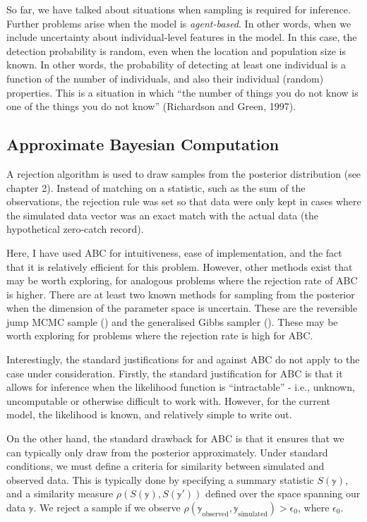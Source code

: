\documentclass[
  oneside]{book}
\begin{document}
So far, we have talked about situations when sampling is required for inference. Further problems arise when the model is \emph{agent-based}. In other words, when we include uncertainty about individual-level features in the model. In this case, the detection probability is random, even when the location and population size is known. In other words, the probability of detecting at least one individual is a function of the number of individuals, and also their individual (random) properties. This is a situation in which ``the number of things you do not know is one of the things you do not know'' (Richardson and Green, 1997).

\hypertarget{approximate-bayesian-computation}{%
\subsection{Approximate Bayesian Computation}\label{approximate-bayesian-computation}}

A rejection algorithm is used to draw samples from the posterior distribution (see chapter 2). Instead of matching on a statistic, such as the sum of the observations, the rejection rule was set so that data were only kept in cases where the simulated data vector was an exact match with the actual data (the hypothetical zero-catch record).

Here, I have used ABC for intuitiveness, ease of implementation, and the fact that it is relatively efficient for this problem. However, other methods exist that may be worth exploring, for analogous problems where the rejection rate of ABC is higher. There are at least two known methods for sampling from the posterior when the dimension of the parameter space is uncertain. These are the reversible jump MCMC sample (\citet{green1995}) and the generalised Gibbs sampler (\citet{keith2015}). These may be worth exploring for problems where the rejection rate is high for ABC.

Interestingly, the standard justifications for and against ABC do not apply to the case under consideration. Firstly, the standard justification for ABC is that it allows for inference when the likelihood function is ``intractable'' - i.e., unknown, uncomputable or otherwise difficult to work with. However, for the current model, the likelihood is known, and relatively simple to write out.

On the other hand, the standard drawback for ABC is that it ensures that we can typically only draw from the posterior approximately. Under standard conditions, we must define a criteria for similarity between simulated and observed data. This is typically done by specifying a summary statistic \(S(\mathbb y)\), and a similarity measure \(\rho(S(\mathbb y), S(\mathbb y'))\) defined over the space spanning our data \(\mathbb y\). We reject a sample if we observe \(\rho(\mathbb y_{\text{observed}}, \mathbb y_{\text{simulated}} ) > \epsilon_0\), where \(\epsilon_0\).
\end{document}
